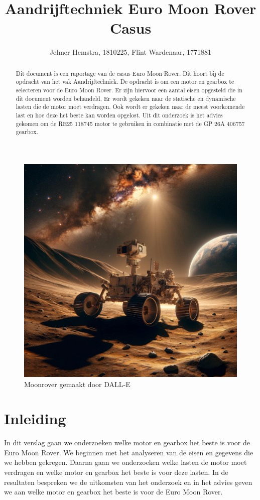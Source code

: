 \documentclass{article}
\title{Aandrijftechniek Euro Moon Rover Casus}
\author{Jelmer Hemstra, 1810225, Flint Wardenaar, 1771881}
\begin{document}
\maketitle
\begin{figure}[h]
    \centering
    \includegraphics[width=1\textwidth]{Maanlanderfixed.png}
    \caption{Moonrover gemaakt door DALL-E}
    \label{fig:moonrover2}
\end{figure}
\newpage
\tableofcontents
\newpage
\begin{abstract}
    Dit document is een raportage van de casus Euro Moon Rover. 
    Dit hoort bij de opdracht van het vak Aandrijftechniek.
    De opdracht is om een motor en gearbox te selecteren voor de Euro Moon Rover.
    Er zijn hiervoor een aantal eisen opgesteld die in dit document worden behandeld.
    Er wordt gekeken naar de statische en dynamische lasten die de motor moet verdragen.
    Ook wordt er gekeken naar de meest voorkomende last en hoe deze het beste kan worden opgelost.
    Uit dit onderzoek is het advies gekomen om de RE25 118745 motor te gebruiken in combinatie met de GP 26A 406757 gearbox.
\end{abstract}


\section{Inleiding}
    In dit verslag gaan we onderzoeken welke motor en gearbox het beste is voor de Euro Moon Rover.
    We beginnen met het analyseren van de eisen en gegevens die we hebben gekregen.
    Daarna gaan we onderzoeken welke lasten de motor moet verdragen en welke motor en gearbox het beste is voor deze lasten.
    In de resultaten bespreken we de uitkomsten van het onderzoek en in het advies geven we aan welke motor en gearbox het beste is voor de Euro Moon Rover.
\end{document}
